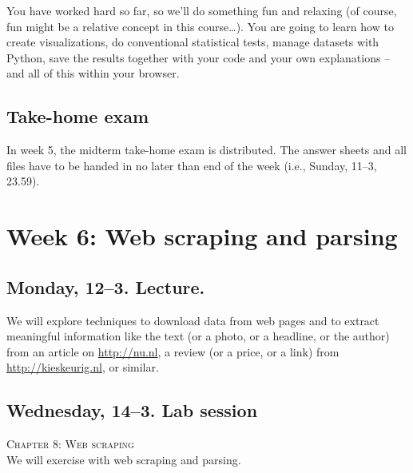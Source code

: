 \documentclass[a4paper,10pt]{report}
\begin{document}
You have worked hard so far, so we'll do something fun and relaxing (of course, fun might be a relative concept in this course\ldots). You are going to learn how to create visualizations, do conventional statistical tests, manage datasets with Python, save the results together with your code and your own explanations -- and all of this within your browser.



\subsection*{Take-home exam}
In week 5, the midterm take-home exam is distributed. The answer sheets and all files have to be handed in no later than end of the week (i.e., Sunday, 11--3, 23.59).




\section*{Week 6: Web scraping and parsing}

\subsection*{Monday, 12--3. Lecture.}
We will explore techniques to download data from web pages and to extract meaningful information like the text (or a photo, or a headline, or the author) from an article on \url{http://nu.nl}, a review (or a price, or a link) from \url{http://kieskeurig.nl}, or similar. 

\subsection*{Wednesday, 14--3. Lab session}
\textsc{ Chapter 8: Web scraping}\\
We will exercise with web scraping and parsing.

%
%
%
%
%
%
\end{document}
